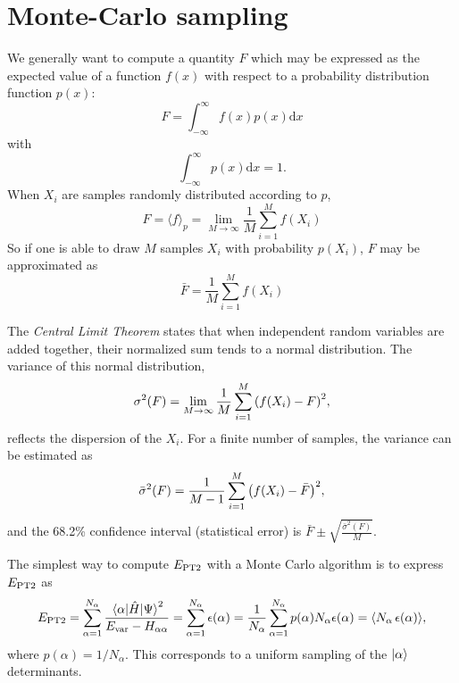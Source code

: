 \documentclass[./thesis.tex]{subfiles}
\begin{document}
\section{Monte-Carlo sampling}

We generally want to compute a quantity $F$ which may be expressed as the expected value of a function $f(x)$ with respect to a probability distribution function $p(x)$:
\begin{equation}
F = \int_{-\infty}^\infty f(x) p(x) \text{d} x
\end{equation}
with 
\begin{equation}
\int_{-\infty}^\infty p(x) \text{d} x = 1.
\end{equation}
When $X_i$ are samples randomly distributed according to $p$, 
\begin{equation}
\label{eq:sum_mc}
F = \langle f \rangle_p =  \lim_{M\rightarrow \infty} \frac{1}{M} \sum_{i=1}^{M} f(X_i)
\end{equation}
So if one is able to draw $M$ samples $X_i$ with probability $p(X_i)$, $F$ may be approximated as
\begin{equation}
\bar{F} = \frac{1}{M} \sum_{i=1}^{M} f(X_i)
\end{equation}

The \emph{Central Limit Theorem} states that when independent random variables are added together, their normalized sum tends to a normal distribution. The variance of this normal distribution, 
\begin{equation}
\sigma^2(F) = \lim_{M\rightarrow \infty} \frac{1}{M} \sum_{i=1}^{M} \qty( f(X_i) - F)^2,
\end{equation}
reflects the dispersion of the $X_i$.
For a finite number of samples, the variance can be estimated as
\begin{equation}
\bar{\sigma}^2(F) = \frac{1}{M-1} \sum_{i=1}^{M} \qty( f(X_i) - \bar{F})^2,
\end{equation}
and the 68.2\% confidence interval (statistical error) is $\bar{F} \pm \sqrt{\frac{\bar{\sigma}^2(F)}{M}}$.

The simplest way to compute $E_\text{PT2}$ with a Monte Carlo algorithm is to express $E_\text{PT2}$ as
\begin{equation}
E_\text{PT2} = \sum_{\alpha = 1}^{N_\alpha} \frac{ \mel{\alpha}{\hat{H}}{\Psi}^2 }{E_\text{var} - H_{\alpha \alpha} } = \sum_{\alpha = 1}^{N_\alpha} \epsilon(\alpha) = \frac{1}{N_\alpha} \sum_{\alpha = 1}^{N_\alpha} p(\alpha) N_\alpha \epsilon(\alpha) = \langle N_\alpha\, \epsilon(\alpha) \rangle,
\end{equation}
where $p(\alpha) = 1 / N_\alpha$. This corresponds to a uniform sampling of the ${\ket{\alpha}}$ determinants.
\end{document}
